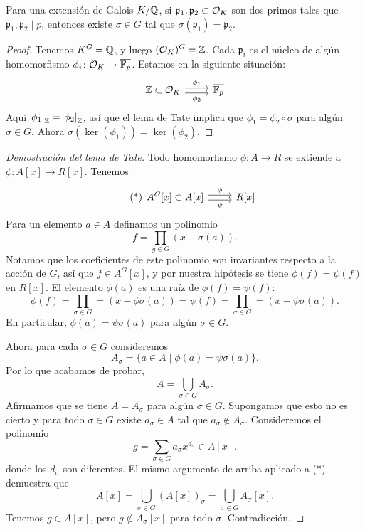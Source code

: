 \begin{corolario}
  Para una extensión de Galois $K/\mathbb{Q}$, si
  $\mathfrak{p}_1, \mathfrak{p}_2 \subset \mathcal{O}_K$ son dos primos tales que
  $\mathfrak{p}_1, \mathfrak{p}_2 \mid p$, entonces existe $\sigma \in G$
  tal que $\sigma (\mathfrak{p}_1) = \mathfrak{p}_2$.

  \begin{proof}
    Tenemos $K^G = \mathbb{Q}$, y luego $(\mathcal{O}_K)^G = \mathbb{Z}$. Cada $\mathfrak{p}_i$ es
    el núcleo de algún homomorfismo $\phi_i\colon \mathcal{O}_K \to \overline{\mathbb{F}_p}$.
    Estamos en la siguiente situación:
    \[ \begin{tikzcd}
      \ZZ &[-3em] \subset &[-3em] \O_K \ar[shift left=0.25em]{r}{\phi_1}\ar[shift right=0.25em]{r}[swap]{\phi_2} & \overline{\FF_p}
    \end{tikzcd} \]
    Aquí $\left.\phi_1\right|_{\mathbb{Z}} = \left.\phi_2\right|_{\mathbb{Z}}$, así que
    el lema de Tate implica que $\phi_1 = \phi_2\circ\sigma$ para algún
    $\sigma \in G$. Ahora $\sigma (\ker (\phi_1)) = \ker (\phi_2)$.
  \end{proof}
\end{corolario}

\begin{proof}[Demostración del lema de Tate]
  Todo homomorfismo $\phi\colon A\to R$ se extiende a
  $\phi\colon A[x] \to R[x]$. Tenemos
  \[ \tag{*} \begin{tikzcd}
    A^G [x] &[-3em] \subset &[-3em] A [x] \ar[shift left=0.25em]{r}{\phi}\ar[shift right=0.25em]{r}[swap]{\psi} & R [x]
  \end{tikzcd} \]
  Para un elemento $a \in A$ definamos un polinomio
  $$f = \prod_{g\in G} (x - \sigma (a)).$$
  Notamos que los coeficientes de este polinomio son invariantes respecto
  a la acción de $G$, así que $f \in A^G [x]$, y por nuestra hipótesis
  se tiene $\phi (f) = \psi (f)$ en $R [x]$. El elemento $\phi (a)$ es una raíz
  de $\phi (f) = \psi (f)$:
  \[ \phi (f) = \prod_{\sigma \in G} = (x - \phi \sigma (a)) =
     \psi (f) = \prod_{\sigma \in G} = (x - \psi \sigma (a)). \]
  En particular, $\phi (a) = \psi \sigma (a)$ para algún $\sigma \in G$.

  Ahora para cada $\sigma \in G$ consideremos
  $$A_\sigma = \{ a \in A \mid \phi (a) = \psi \sigma (a) \}.$$
  Por lo que acabamos de probar,
  $$A = \bigcup_{\sigma \in G} A_\sigma.$$
  Afirmamos que se tiene $A = A_\sigma$ para algún $\sigma \in G$. Supongamos
  que esto no es cierto y para todo $\sigma \in G$ existe $a_\sigma \in A$
  tal que $a_\sigma \notin A_\sigma$. Consideremos el polinomio
  $$g = \sum_{\sigma \in G} a_\sigma x^{d_\sigma} \in A [x].$$
  donde los $d_\sigma$ son diferentes. El mismo argumento de arriba aplicado
  a (*) demuestra que
  \[ A [x] = \bigcup_{\sigma \in G} (A [x])_\sigma
           = \bigcup_{\sigma \in G} A_\sigma [x]. \]
  Tenemos $g \in A [x]$, pero $g \notin A_\sigma [x]$ para todo $\sigma$.
  Contradicción.
\end{proof}

